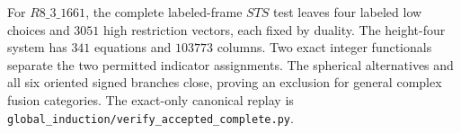 For $R8\_3\_1661$, the complete labeled-frame $STS$ test leaves four
labeled low choices and $3051$ high restriction vectors, each fixed by
duality. The height-four system has $341$ equations and $103773$ columns.
Two exact integer functionals separate the two permitted indicator
assignments. The spherical alternatives and all six oriented signed
branches close, proving an exclusion for general complex fusion
categories. The exact-only canonical replay is
\texttt{global\_induction/verify\_accepted\_complete.py}.
